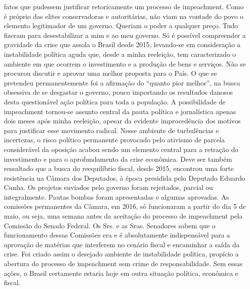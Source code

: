 fatos que pudessem justificar retoricamente um processo de impeachment.
Como é próprio das elites conservadoras e autoritárias, não viam na
vontade do povo o elemento legitimador de um governo. Queriam o poder a
qualquer preço. Tudo fizeram para desestabilizar a mim e ao meu governo.
Só é possível compreender a gravidade da crise que assola o Brasil desde
2015, levando-se em consideração a instabilidade política aguda que,
desde a minha reeleição, tem caracterizado o ambiente em que ocorrem o
investimento e a produção de bens e serviços. Não se procurou discutir e
aprovar uma melhor proposta para o País. O que se pretendeu
permanentemente foi a afirmação do ``quanto pior melhor'', na busca
obsessiva de se desgastar o governo, pouco importando os resultados
danosos desta questionável ação política para toda a população. A
possibilidade de impeachment tornou-se assunto central da pauta política
e jornalística apenas dois meses após minha reeleição, apesar da
evidente improcedência dos motivos para justificar esse movimento
radical. Nesse ambiente de turbulências e incertezas, o risco político
permanente provocado pelo ativismo de parcela considerável da oposição
acabou sendo um elemento central para a retração do investimento e para
o aprofundamento da crise econômica. Deve ser também ressaltado que a
busca do reequilíbrio fiscal, desde 2015, encontrou uma forte
resistência na Câmara dos Deputados, à época presidida pelo Deputado
Eduardo Cunha. Os projetos enviados pelo governo foram rejeitados,
parcial ou integralmente. Pautas bombas foram apresentadas e algumas
aprovadas. As comissões permanentes da Câmara, em 2016, só funcionaram a
partir do dia 5 de maio, ou seja, uma semana antes da aceitação do
processo de impeachment pela Comissão do Senado Federal. Os Srs. e as
Sras. Senadores sabem que o funcionamento dessas Comissões era e é
absolutamente indispensável para a aprovação de matérias que interferem
no cenário fiscal e encaminhar a saída da crise. Foi criado assim o
desejado ambiente de instabilidade política, propício a abertura do
processo de impeachment sem crime de responsabilidade. Sem essas ações,
o Brasil certamente estaria hoje em outra situação política, econômica e
fiscal.

